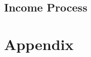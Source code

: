 \documentclass[12pt, a4paper]{article}
\renewcommand{\thefigure}{\Roman{figure}}
\begin{document}
\subsection{Income Process}\label{sec:income_process}


\newpage
{}

%
 

\newpage
\setcounter{section}{0}
\renewcommand{\thesection}{\Alph{section}} 
\renewcommand{\thesubsection}{\thesection.\arabic{subsection}}
\section{Appendix\label{Sec: Preliminary}}
\setcounter{table}{0}
\renewcommand{\thetable}{A\arabic{table}}
\setcounter{figure}{0}
\renewcommand{\thefigure}{A\arabic{figure}}
\end{document}
